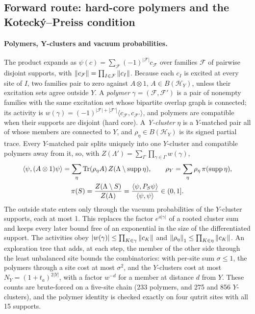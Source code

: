 \subsection{Forward route: hard-core polymers and the Kotecký--Preiss condition}
\label{sec:bb1-forward}
\paragraph{Polymers, Y-clusters and vacuum probabilities.} The product
expands as $\psi(c)=\sum_{\mathcal F}(-1)^{|\mathcal F|}c_{\mathcal F}$ over
families $\mathcal F$ of pairwise disjoint supports, with
$\left\lVert c_{\mathcal F}\right\rVert=\prod_{I\in\mathcal F}\left\lVert c_I\right\rVert$. Because each $c_I$
is excited at every site of $I$, two families pair to zero against
$A\otimes1$, $A\in B(\mathcal H_Y)$, unless their excitation sets agree
outside $Y$. A \emph{polymer} $\gamma=(\mathcal F,\mathcal F')$ is a pair of
nonempty families with the same excitation set whose bipartite overlap graph
is connected; its activity is
$w(\gamma)=(-1)^{|\mathcal F|+|\mathcal F'|}\langle c_{\mathcal F},c_{\mathcal F'}\rangle$,
and polymers are compatible when their supports are disjoint (hard core). A
\emph{Y-cluster} $\eta$ is a $Y$-matched pair all of whose members are
connected to $Y$, and $\rho_\eta\in B(\mathcal H_Y)$ is its signed partial
trace. Every $Y$-matched pair splits uniquely into one $Y$-cluster and
compatible polymers away from it, so, with
$Z(\Lambda')=\sum_\Gamma\prod_{\gamma\in\Gamma}w(\gamma)$,
\begin{equation}
 \begin{gathered}
 \langle\psi,(A\otimes1)\psi\rangle=\sum_\eta\operatorname{Tr}(\rho_\eta A)\,
 Z(\Lambda\setminus\operatorname{supp}\eta),\qquad
 \rho_Y=\sum_\eta\rho_\eta\,\pi(\operatorname{supp}\eta),\\
 \pi(S)=\frac{Z(\Lambda\setminus S)}{Z(\Lambda)}
 =\frac{\langle\psi,P_S\psi\rangle}{\langle\psi,\psi\rangle}\in(0,1].
 \end{gathered}
 \label{eq:bb1-polymers}
\end{equation}
The outside state enters only through the vacuum probabilities of the
$Y$-cluster supports, each at most 1. This replaces the factor $e^{a|\gamma|}$
of a rooted cluster sum and keeps every later bound free of an exponential in
the size of the differentiated support. The activities obey
$|w(\gamma)|\le\prod_{K\in\gamma}\left\lVert c_K\right\rVert$ and
$\left\lVert\rho_\eta\right\rVert_1\le\prod_{K\in\eta}\left\lVert c_K\right\rVert$. An exploration tree that
adds, at each step, the member of the other side through the least unbalanced
site bounds the combinatorics: with per-site sum $\sigma\le1$, the polymers
through a site cost at most $\sigma^2$, and the $Y$-clusters cost at most
$N_Y=(1+t_a)^{2|Y|}$, with a factor $w^{-d}$ for a member at distance $d$ from
$Y$. These counts are brute-forced on a five-site chain (233 polymers, and 275
and 856 $Y$-clusters), and the polymer identity is checked exactly on four
qutrit sites with all 15 supports.

